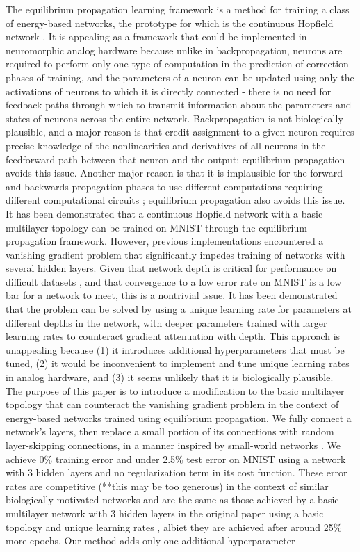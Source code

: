 \documentclass[format=sigconf]{acmart}
\newcommand{\npar}{\\\indent}
\begin{document}
The equilibrium propagation learning framework \cite{scellier17} is a method for training a class of energy-based networks, the prototype for which is the continuous Hopfield network \cite{hopfield1984}. It is appealing as a framework that could be implemented in neuromorphic analog hardware because unlike in backpropagation, neurons are required to perform only one type of computation in the prediction of correction phases of training, and the parameters of a neuron can be updated using only the activations of neurons to which it is directly connected - there is no need for feedback paths through which to transmit information about the parameters and states of neurons across the entire network. Backpropagation is not biologically plausible, and a major reason is that credit assignment to a given neuron requires precise knowledge of the nonlinearities and derivatives of all neurons in the feedforward path between that neuron and the output\cite{bengio2015}; equilibrium propagation avoids this issue. Another major reason is that it is implausible for the forward and backwards propagation phases to use different computations requiring different computational circuits \cite{scellier17}; equilibrium propagation also avoids this issue.
\npar
It has been demonstrated \cite{scellier17} that a continuous Hopfield network with a basic multilayer topology can be trained on MNIST \cite{mnist1998} through the equilibrium propagation framework. However, previous implementations encountered a vanishing gradient problem that significantly impedes training of networks with several hidden layers. Given that network depth is critical for performance on difficult datasets \cite{simonyan2014, srivastava2015tvdn}, and that convergence to a low error rate on MNIST is a low bar for a network to meet, this is a nontrivial issue. It has been demonstrated \cite{scellier17} that the problem can be solved by using a unique learning rate for parameters at different depths in the network, with deeper parameters trained with larger learning rates to counteract gradient attenuation with depth. This approach is unappealing because (1) it introduces additional hyperparameters that must be tuned, (2) it would be inconvenient to implement and tune unique learning rates in analog hardware, and (3) it seems unlikely that it is biologically plausible.
\npar
The purpose of this paper is to introduce a modification to the basic multilayer topology that can counteract the vanishing gradient problem in the context of energy-based networks trained using equilibrium propagation. We fully connect a network's layers, then replace a small portion of its connections with random layer-skipping connections, in a manner inspired by small-world networks \cite{watts98}. We achieve 0\% training error and under 2.5\% test error on MNIST using a network with 3 hidden layers and no regularization term in its cost function. These error rates are competitive (**this may be too generous) in the context of similar biologically-motivated networks \cite{bartunov2018} and are the same as those achieved by a basic multilayer network with 3 hidden layers in the original paper using a basic topology and unique learning rates \cite{scellier17}, albiet they are achieved after around 25\% more epochs. Our method adds only one additional hyperparameter
\end{document}
